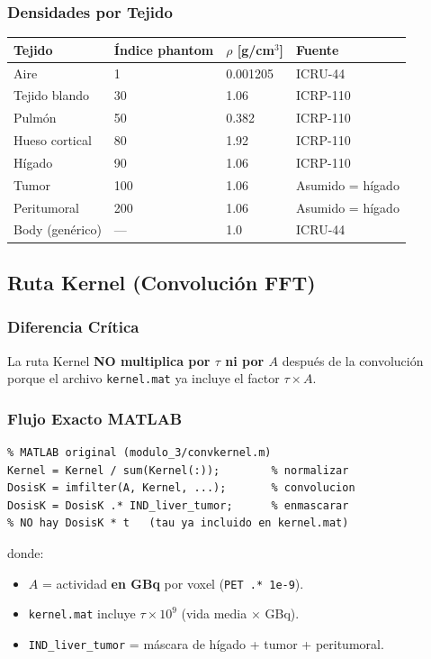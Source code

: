 \documentclass[12pt,a4paper]{article}
\begin{document}
\subsubsection{Densidades por Tejido}

\begin{tabular}{p{4cm} p{3cm} p{2.5cm} p{3cm}}
\toprule
\textbf{Tejido} & \textbf{Índice phantom} & $\rho$ [g/cm$^3$] & \textbf{Fuente} \\
\midrule
Aire & 1 & 0.001205 & ICRU-44 \\
Tejido blando & 30 & 1.06 & ICRP-110 \\
Pulmón & 50 & 0.382 & ICRP-110 \\
Hueso cortical & 80 & 1.92 & ICRP-110 \\
Hígado & 90 & 1.06 & ICRP-110 \\
Tumor & 100 & 1.06 & Asumido = hígado \\
Peritumoral & 200 & 1.06 & Asumido = hígado \\
Body (genérico) & --- & 1.0 & ICRU-44 \\
\bottomrule
\end{tabular}

\subsection{Ruta Kernel (Convolución FFT)}

\subsubsection{Diferencia Crítica}

La ruta Kernel \textbf{NO multiplica por $\tau$ ni por $A$} después de la convolución porque el archivo \texttt{kernel.mat} ya incluye el factor $\tau \times A$.

\subsubsection{Flujo Exacto MATLAB}

\begin{verbatim}
% MATLAB original (modulo_3/convkernel.m)
Kernel = Kernel / sum(Kernel(:));        % normalizar
DosisK = imfilter(A, Kernel, ...);       % convolucion
DosisK = DosisK .* IND_liver_tumor;      % enmascarar
% NO hay DosisK * t   (tau ya incluido en kernel.mat)
\end{verbatim}

donde:
\begin{itemize}
  \item $A$ = actividad \textbf{en GBq} por voxel (\texttt{PET .* 1e-9}).
  \item \texttt{kernel.mat} incluye $\tau \times 10^9$ (vida media $\times$ GBq).
  \item \texttt{IND\_liver\_tumor} = máscara de hígado + tumor + peritumoral.
\end{itemize}
\end{document}
